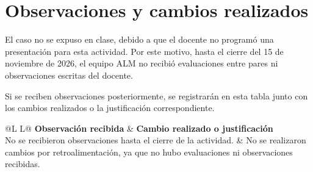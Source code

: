 
\section*{Observaciones y cambios realizados}

El caso no se expuso en clase, debido a que el docente
no programó una presentación para esta actividad.
Por este motivo, hasta el cierre del 15 de noviembre
de 2026, el equipo ALM no recibió evaluaciones entre
pares ni observaciones escritas del docente.

Si se reciben observaciones posteriormente, se
registrarán en esta tabla junto con los cambios
realizados o la justificación correspondiente.

\begin{table}[htbp]
\centering
\small
\begin{tabularx}{\linewidth}{@{}L L@{}}
\toprule
\textbf{Observación recibida} &
\textbf{Cambio realizado o justificación} \\
\midrule
No se recibieron observaciones hasta el cierre
de la actividad.
&
No se realizaron cambios por retroalimentación,
ya que no hubo evaluaciones ni observaciones recibidas. \\
\bottomrule
\end{tabularx}
\end{table}
